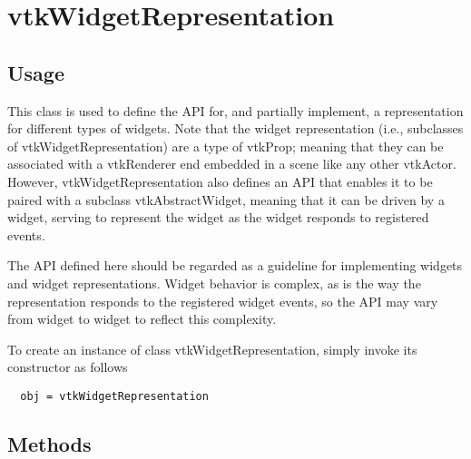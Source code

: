 \section{vtkWidgetRepresentation}

\subsection{Usage}

 This class is used to define the API for, and partially implement, a
 representation for different types of widgets. Note that the widget
 representation (i.e., subclasses of vtkWidgetRepresentation) are a type of
 vtkProp; meaning that they can be associated with a vtkRenderer end
 embedded in a scene like any other vtkActor. However,
 vtkWidgetRepresentation also defines an API that enables it to be paired
 with a subclass vtkAbstractWidget, meaning that it can be driven by a
 widget, serving to represent the widget as the widget responds to
 registered events. 

 The API defined here should be regarded as a guideline for implementing
 widgets and widget representations. Widget behavior is complex, as is the
 way the representation responds to the registered widget events, so the API
 may vary from widget to widget to reflect this complexity.

To create an instance of class vtkWidgetRepresentation, simply
invoke its constructor as follows
\begin{verbatim}
  obj = vtkWidgetRepresentation
\end{verbatim}
\subsection{Methods}

